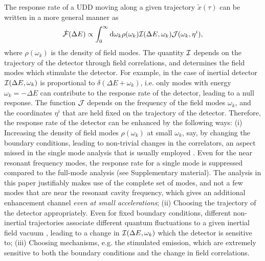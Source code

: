 \documentclass[aps,prl,nofootinbib,preprintnumbers,floatfix,twocolumn,superscriptaddress]{revtex4}
\def\d{{\rm d}}
\begin{document}
The response rate of a UDD moving along a 
given trajectory ${\tilde x}(\tau)$ can be written in a 
more general manner as 
\begin{equation}
{\dot {\cal F}}(\Delta E) \propto 
\int_{0}^{\infty} \d\omega_{k} \rho(\omega_{k}) {\cal I}(\Delta E,\omega_{k})
{\cal J}(\omega_k,\eta^{i}),
\end{equation}
where $\rho(\omega_{k})$ is the density of field modes. The 
quantity ${\cal I}$ depends on the trajectory of the detector through 
field correlations, and determines the field modes which stimulate 
the detector. For example, in the case of 
inertial detector ${\cal I}(\Delta E,\omega_{k})$ is proportional to 
$\delta(\Delta E+\omega_{k})$,  i.e. only modes with energy 
$\omega_{k}=-\Delta E$ can contribute to the response rate of the 
detector, leading to a null response. 
The function ${\cal J}$ depends on the frequency of 
the field modes $\omega_k$, and the coordinates $\eta^{i}$ 
that are held fixed on the trajectory of the detector. Therefore, 
the response rate of the detector 
can be enhanced by the following ways: (i) Increasing the density 
of field modes $\rho(\omega_{k})$ at small $\omega_k$, say, by changing 
the boundary conditions, leading to non-trivial 
changes in the correlators, an aspect missed in the single mode analysis that is
usually employed \cite{Deb-1997,Prants-1999,Scully-2003,Scully-2006,Mann-2011,Lopp-2018}. 
Even for the near resonant 
frequency modes, the response rate for a single mode \cite{Lopp-2018} is suppressed compared 
to the full-mode analysis  (see Supplementary material). 
The analysis in this paper justifiably makes use of the complete set of modes, and not a few modes 
that are near the resonant cavity frequency, which gives an additional enhancement 
channel {\it even at small accelerations}; 
(ii) Choosing the trajectory of the detector appropriately. Even for fixed 
boundary conditions, different non-inertial trajectories associate different quantum 
fluctuations to a given inertial field vacuum \cite{Letaw-1981}, leading to a change in 
${\cal I}(\Delta E,\omega_{k})$ which the detector is sensitive to; 
(iii) Choosing mechanisms, e.g. the stimulated emission, which are extremely 
sensitive to both the boundary conditions and the change in field correlations. 
\end{document}
